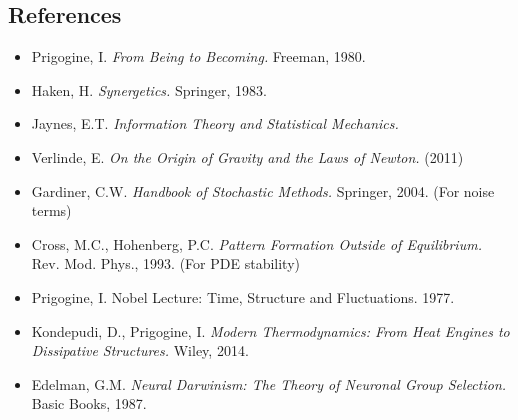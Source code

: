 \documentclass[12pt]{article}
\theoremstyle{definition}
\begin{document}
\subsection{References}
\begin{itemize}
\item Prigogine, I. \emph{From Being to Becoming.} Freeman, 1980.
\item Haken, H. \emph{Synergetics.} Springer, 1983.
\item Jaynes, E.T. \emph{Information Theory and Statistical Mechanics.}
\item Verlinde, E. \emph{On the Origin of Gravity and the Laws of Newton.} (2011)
\item Gardiner, C.W. \emph{Handbook of Stochastic Methods.} Springer, 2004. (For noise terms)
\item Cross, M.C., Hohenberg, P.C. \emph{Pattern Formation Outside of Equilibrium.} Rev. Mod. Phys., 1993. (For PDE stability)
\item Prigogine, I. Nobel Lecture: Time, Structure and Fluctuations. 1977.
\item Kondepudi, D., Prigogine, I. \emph{Modern Thermodynamics: From Heat Engines to Dissipative Structures.} Wiley, 2014.
\item Edelman, G.M. \emph{Neural Darwinism: The Theory of Neuronal Group Selection.} Basic Books, 1987.
\end{itemize}
\end{document}
